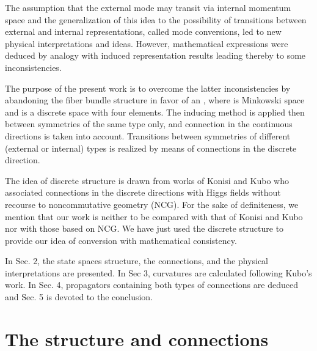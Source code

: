 \documentclass[12pt,a4paper]{article}
\begin{document}
The assumption that the external mode may transit via internal momentum space
and the generalization of this idea to the possibility of transitions between
external and internal representations, called mode conversions, led to new
physical interpretations and ideas. However, mathematical expressions were
deduced by analogy with induced representation results leading thereby to some
inconsistencies.\cite{Smida 2000}

The purpose of the present work is to overcome the latter inconsistencies by
abandoning the fiber bundle structure in favor of an \coordHE{}, where \coordHE{} is Minkowski space and \coordHE{} is
a discrete space with four elements. The inducing method is applied then
between symmetries of the same type only, and connection in the continuous
directions is taken into account. Transitions between symmetries of different
(external or internal) types is realized by means of connections in the
discrete direction.

The idea of discrete structure is drawn from works of Konisi\cite{Konisi 1996}
and Kubo\cite{Kubo 1998} who associated connections in the discrete directions
with Higgs fields without recourse to noncommutative geometry (NCG). For the
sake of definiteness, we mention that our work is neither to be compared with
that of Konisi and Kubo nor with those based on NCG. We have just used the
discrete structure to provide our idea of conversion with mathematical consistency.

In Sec. 2, the state spaces structure, the connections, and the physical
interpretations are presented. In Sec 3, curvatures are calculated following
Kubo's work.\cite{Kubo 1998} In Sec. 4, propagators containing both types of
connections are deduced and Sec. 5 is devoted to the conclusion.

\section{The structure and connections}
\end{document}
